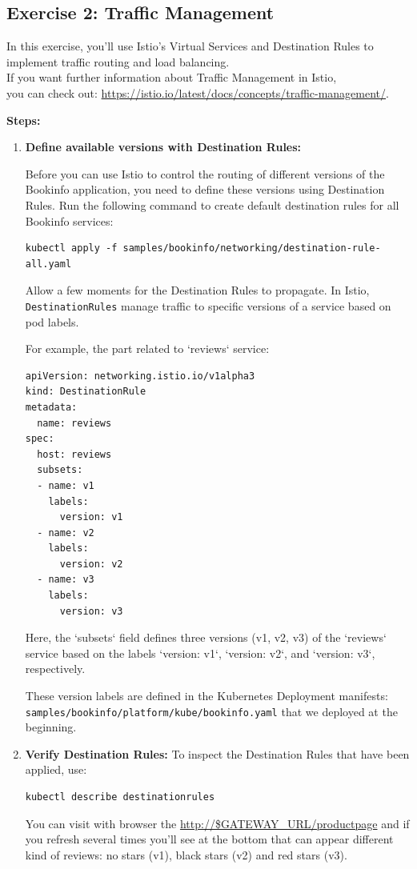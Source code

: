 \documentclass{article}
\begin{document}
\subsection{Exercise 2: Traffic Management}
In this exercise, you'll use Istio's Virtual Services and Destination Rules to implement traffic routing and load balancing. \\

If you want further information about Traffic Management in Istio, \\you can check out: \footnotesize\url{https://istio.io/latest/docs/concepts/traffic-management/}. \\

\normalsize

\textbf{Steps:}
\begin{enumerate}
    \item \textbf{Define available versions with Destination Rules:}
    
    Before you can use Istio to control the routing of different versions of the Bookinfo application, you need to define these versions using Destination Rules. Run the following command to create default destination rules for all Bookinfo services:    
    \begin{lstlisting}
kubectl apply -f samples/bookinfo/networking/destination-rule-all.yaml
    \end{lstlisting}
    Allow a few moments for the Destination Rules to propagate. In Istio, \texttt{DestinationRules} manage traffic to specific versions of a service based on pod labels. 
    
    For example, the part related to `reviews` service:
    \begin{lstlisting}
apiVersion: networking.istio.io/v1alpha3
kind: DestinationRule
metadata:
  name: reviews
spec:
  host: reviews
  subsets:
  - name: v1
    labels:
      version: v1
  - name: v2
    labels:
      version: v2
  - name: v3
    labels:
      version: v3
        \end{lstlisting}
    Here, the `subsets` field defines three versions (v1, v2, v3) of the `reviews` service based on the labels `version: v1`, `version: v2`, and `version: v3`, respectively.
    
    These version labels are defined in the Kubernetes Deployment manifests: \\\texttt{samples/bookinfo/platform/kube/bookinfo.yaml} that we deployed at the beginning.

    \item \textbf{Verify Destination Rules:}
    To inspect the Destination Rules that have been applied, use:
    \begin{lstlisting}
kubectl describe destinationrules
    \end{lstlisting}
    You can visit with browser the \url{http://$GATEWAY_URL/productpage} and if you refresh several times you'll see at the bottom that can appear different kind of reviews: no stars (v1), black stars (v2) and red stars (v3).



\end{enumerate}
\end{document}
